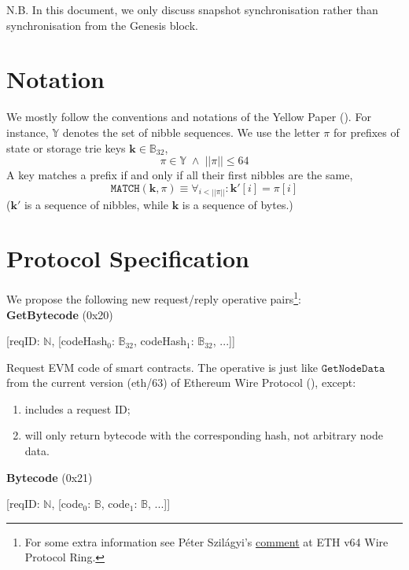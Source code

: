 \documentclass{amsart}
\begin{document}
N.B. In this document, we only discuss snapshot synchronisation rather than synchronisation from the Genesis block.

\section{Notation}

We mostly follow the conventions and notations of the Yellow Paper (\cite{yellow_paper}).
For instance, $\mathbb{Y}$ denotes the set of nibble sequences.
We use the letter $\pi$ for prefixes of state or storage trie keys $\mathbf{k} \in \mathbb{B}_{32}$,
\begin{equation}
    \pi \in \mathbb{Y} \; \land \; ||\pi|| \leq 64
\end{equation}
A key matches a prefix if and only if all their first nibbles are the same,
\begin{equation}
    \texttt{MATCH}(\mathbf{k}, \pi) \equiv \forall_{i < ||\pi||}: \mathbf{k}'[i] = \pi[i]
\end{equation}
($\mathbf{k}'$ is a sequence of nibbles, while $\mathbf{k}$ is a sequence of bytes.)

\section{Protocol Specification}

We propose the following new request/reply operative pairs\footnote{For
some extra information see Péter Szilágyi's
\href{https://ethereum-magicians.org/t/forming-a-ring-eth-v64-wire-protocol-ring/2857/10}{comment}
at ETH v64 Wire Protocol Ring.}:\\

\textbf{GetBytecode} (0x20)

[reqID: $\mathbb{N}$,
[codeHash$_0$: $\mathbb{B}_{32}$, codeHash$_1$: $\mathbb{B}_{32}$, ...]]
\medskip

Request EVM code of smart contracts.
The operative is just like $\texttt{GetNodeData}$ from the current version (eth/63) of Ethereum Wire Protocol (\cite{wire_protocol}), except:
\begin{enumerate}
\item includes a request ID;
\item will only return bytecode with the corresponding hash, not arbitrary node data.
\end{enumerate}
\bigskip

\textbf{Bytecode} (0x21)

[reqID: $\mathbb{N}$,
[code$_0$: $\mathbb{B}$, code$_1$: $\mathbb{B}$, ...]]
\medskip
\end{document}
